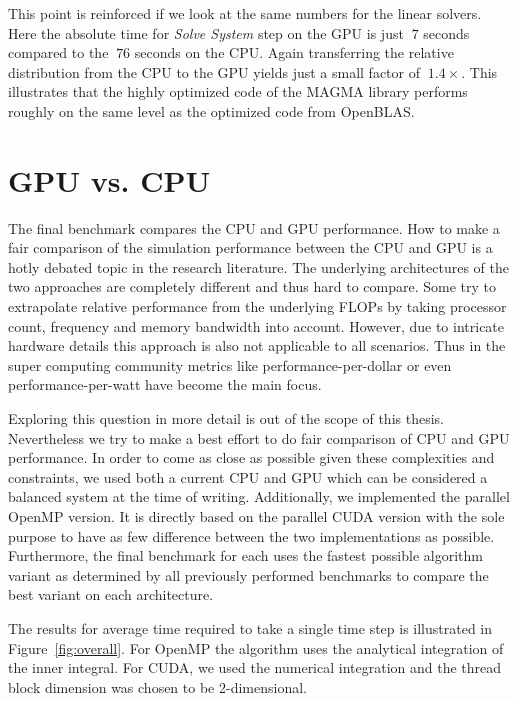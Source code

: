 This point is reinforced if we look at the same numbers for the linear solvers. Here the absolute time for \emph{Solve System} step on the GPU is just $~7$ seconds compared to the $~76$ seconds on the CPU. Again transferring the relative distribution from the CPU to the GPU yields just a small factor of $~1.4×$. This illustrates that the highly optimized code of the MAGMA library performs roughly on the same level as the optimized code from OpenBLAS.

\section{GPU vs. CPU}

The final benchmark compares the CPU and GPU performance. How to make a fair comparison of the simulation performance between the CPU and GPU is a hotly debated topic in the research literature\cite{Lee2010}\cite{Gregg2011}. The underlying architectures of the two approaches are completely different and thus hard to compare. Some try to extrapolate relative performance from the underlying FLOPs by taking processor count, frequency and memory bandwidth into account\cite{Lee2010}. However, due to intricate hardware details this approach is also not applicable to all scenarios. Thus in the super computing community metrics like performance-per-dollar or even performance-per-watt have become the main focus\cite{Kamil2008}.

Exploring this question in more detail is out of the scope of this thesis. Nevertheless we try to make a best effort to do fair comparison of CPU and GPU performance. In order to come as close as possible given these complexities and constraints, we used both a current CPU and GPU which can be considered a balanced system at the time of writing. Additionally, we implemented the parallel OpenMP version. It is directly based on the parallel CUDA version with the sole purpose to have as few difference between the two implementations as possible. Furthermore, the final benchmark for each uses the fastest possible algorithm variant as determined by all previously performed benchmarks to compare the best variant on each architecture.

The results for average time required to take a single time step is illustrated in Figure~\ref{fig:overall}. For OpenMP the algorithm uses the analytical integration of the inner integral. For CUDA, we used the numerical integration and the thread block dimension was chosen to be 2-dimensional.

